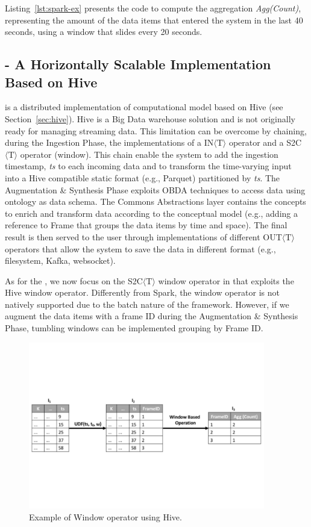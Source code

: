 {Listing~\ref{lst:spark-ex} presents the code to compute the aggregation \textit{Agg(Count)}, representing the amount of the data items that entered the system in the last 40 seconds, using a window that slides every 20 seconds.

\subsection{\protect\hivedi{} - A Horizontally Scalable Implementation Based on Hive} \label{sec:comp-mod-impl-h-hive}
\hivedi{} is a distributed implementation of \river{} computational model based on Hive (see Section~\ref{sec:hive}).
Hive is a Big Data warehouse solution and is not originally ready for managing streaming data.
This limitation can be overcome by chaining, during the Ingestion Phase, the implementations of a IN$\langle\mathrm{T}\rangle$ operator and a S2C$\langle\mathrm{T}\rangle$ operator (window). This chain enable the system to add the ingestion timestamp, \textit{ts} to each incoming data and to transform the time-varying input into a Hive compatible static format (e.g., Parquet) partitioned by \textit{ts}. 
The Augmentation \& Synthesis Phase exploits OBDA techniques to access data using \frappe{} ontology as data schema.
The \frappe{} Commons Abstractions layer contains the concepts to enrich and transform data according to the \frappe{} conceptual model (e.g., adding a reference to \frappe{} Frame that groups the data items by time and space).
The final result is then served to the user through implementations of different OUT$\langle\mathrm{T}\rangle$ operators that allow the system to save the data in different format (e.g., filesystem, Kafka, websocket).

As for the \sparkdi{}, we now focus on the S2C$\langle\mathrm{T}\rangle$ window operator in \hivedi{} that exploits the Hive window operator. Differently from Spark, the window operator is not natively supported due to the batch nature of the framework. However, if we augment the data items with a frame ID during the Augmentation \& Synthesis Phase, tumbling windows can be implemented grouping by Frame ID. 

\begin{figure}[ht]
\centering
\includegraphics[width=0.92\textwidth]{img/hive_example}
\caption{Example of Window operator using Hive.}
\label{fig:hive-ex}
\end{figure} 

}
